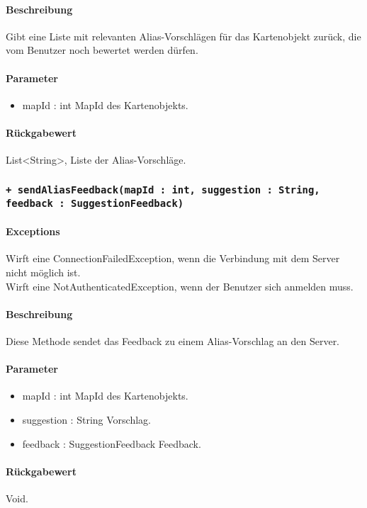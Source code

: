 \paragraph*{Beschreibung}
Gibt eine Liste mit relevanten Alias-Vorschlägen für das Kartenobjekt zurück, 
die vom Benutzer noch bewertet werden dürfen.
\paragraph*{Parameter}
\begin{itemize}
    \item mapId : int MapId des Kartenobjekts.
\end{itemize}
\paragraph*{Rückgabewert}
List<String>, Liste der Alias-Vorschläge.

\subsubsection*{\texttt{+ sendAliasFeedback(mapId : int, suggestion : String, feedback : SuggestionFeedback)}}%
\paragraph*{Exceptions}
Wirft eine ConnectionFailedException, wenn die Verbindung mit dem Server nicht möglich ist.\\
Wirft eine NotAuthenticatedException, wenn der Benutzer sich anmelden muss.
\paragraph*{Beschreibung}
Diese Methode sendet das Feedback zu einem Alias-Vorschlag an den Server.
\paragraph*{Parameter}
\begin{itemize}
    \item mapId : int MapId des Kartenobjekts.
    \item suggestion : String Vorschlag. 
    \item feedback : SuggestionFeedback Feedback.
\end{itemize}
\paragraph*{Rückgabewert}
Void.